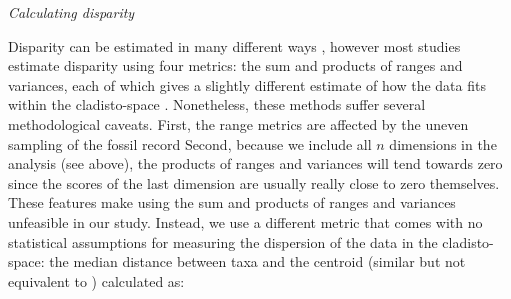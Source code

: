 \documentclass[12pt,letterpaper]{article}
\renewcommand{\subsection}[1]{%
\bigskip
\begin{center}
\begin{large}
\normalfont\itshape #1
\end{large}
\end{center}}
\begin{document}
\subsection{Calculating disparity}
Disparity can be estimated in many different ways \citep[e.g.][]{Wills1994,Ciampaglio2004,thorneresetting2011,hopkinsdecoupling2013,huang2015origins}, however most studies estimate disparity using four metrics: the sum and products of ranges and variances, each of which gives a slightly different estimate of how the data fits within the cladisto-space \citep{Foote01071994,Wills1994,brusatte50,Brusatte12092008,cisneros2010,thorneresetting2011,prentice2011,brusattedinosaur2012,toljagictriassic-jurassic2013,ruta2013,bentonmodels2014,bensonfaunal2014}.
%
Nonetheless, these methods suffer several methodological caveats.
First, the range metrics are affected by the uneven sampling of the fossil record \citep{Butler2012}
Second, because we include all $n$ dimensions in the analysis (see above), the products of ranges and variances will tend towards zero since the scores of the last dimension are usually really close to zero themselves. 
These features make using the sum and products of ranges and variances unfeasible in our study.
Instead, we use a different metric that comes with no statistical assumptions for measuring the dispersion of the data in the cladisto-space: the median distance between taxa and the centroid (similar but not equivalent to \citealt{Wills1994,kornextinction2013,huang2015origins}) calculated as:
\end{document}
